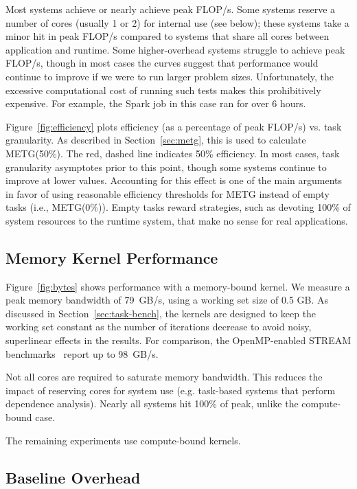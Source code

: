 Most systems achieve or nearly achieve peak FLOP/s. Some
systems reserve a number of cores (usually 1 or 2) for internal
use (see below); these systems take a minor hit in peak FLOP/s compared
to systems that share all cores between application and runtime. Some
higher-overhead systems struggle to achieve peak FLOP/s, though in most cases
the curves suggest that performance would continue to improve if we
were to run larger problem sizes. Unfortunately, the excessive
computational cost of running such tests makes this prohibitively
expensive. For example, the Spark job in
this case ran for over 6 hours.

Figure~\ref{fig:efficiency} plots efficiency (as a percentage of
peak FLOP/s) vs. task granularity. As described in Section~\ref{sec:metg}, this is
used to calculate METG(50\%). The
red, dashed line indicates 50\% efficiency.
In most cases, task granularity asymptotes prior to this point,
though some systems continue to improve at lower values. Accounting for this effect is one of the main arguments in
favor of using reasonable efficiency thresholds for METG instead of
empty tasks
(i.e., METG(0\%)). Empty tasks
reward strategies, such as devoting 100\% of
system resources to the runtime system, that make no sense for real
applications.

\subsection{Memory Kernel Performance}

Figure~\ref{fig:bytes} shows performance with a memory-bound kernel. We measure a peak memory
bandwidth of 79~GB/s, using a working set size of 0.5 GB. As discussed in Section~\ref{sec:task-bench}, the kernels are designed to keep the working set constant as the number of iterations decrease to avoid noisy, superlinear effects in the results. For comparison, the
OpenMP-enabled STREAM benchmarks~\cite{STREAM} report up to 98~GB/s.

Not all cores are required to saturate memory bandwidth. {\color{blue}
  This reduces the impact of reserving cores for system use
  (e.g. task-based systems that perform dependence analysis).} Nearly
all systems hit 100\% of peak, unlike the compute-bound case.

The remaining experiments use compute-bound kernels.


\subsection{Baseline Overhead}

